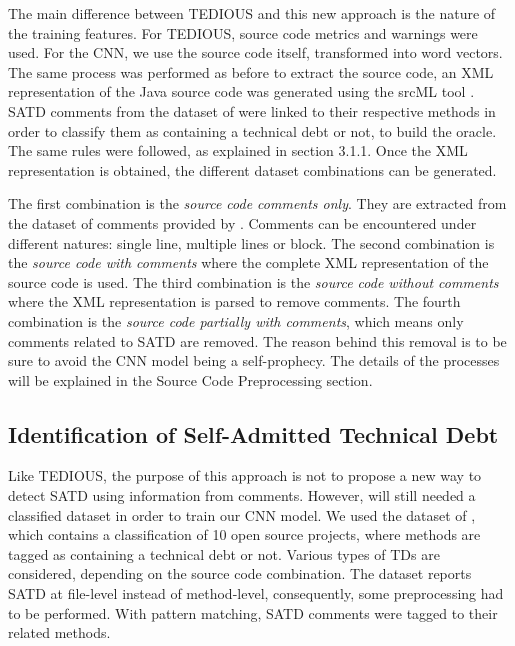 
The main difference between TEDIOUS and this new approach is the nature of the training features. For TEDIOUS, source code metrics and warnings were used. For the CNN, we use the source code itself, transformed into word vectors. The same process was performed as before to extract the source code, an XML representation of the Java source code was generated using the srcML tool \citep{Collard2013}. SATD comments from the dataset of \citet{MaldonadoNLP} were linked to their respective methods in order to classify them as containing a technical debt or not, to build the oracle. The same rules were followed, as explained in section 3.1.1. Once the XML representation is obtained, the different dataset combinations can be generated.

The first combination is the \textit{source code comments only}. They are extracted from the dataset of comments provided by \citet{maldonado17}. Comments can be encountered under different natures: single line, multiple lines or block. The second combination is the \textit{source code with comments} where the complete XML representation of the source code is used. The third combination is the \textit{source code without comments} where the XML representation is parsed to remove comments. The fourth combination is the \textit{source code partially with comments}, which means only comments related to SATD are removed. The reason behind this removal is to be sure to avoid the CNN model being a self-prophecy. The details of the processes will be explained in the Source Code Preprocessing section.

\subsection{Identification of Self-Admitted Technical Debt}


Like TEDIOUS, the purpose of this approach is not to propose a new way to detect SATD using information from comments. However, will still needed a classified dataset in order to train our CNN model. We used the dataset of \citet{maldonado17}, which contains a classification of 10 open source projects, where methods are tagged as containing a technical debt or not. Various types of TDs are considered, depending on the source code combination. The dataset reports SATD at file-level instead of method-level, consequently, some preprocessing had to be performed. With pattern matching, SATD comments were tagged to their related methods.

